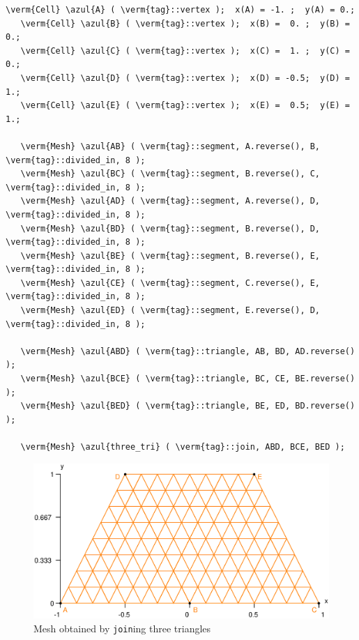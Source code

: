 \begin{Verbatim}[commandchars=\\\{\},formatcom=\small\tt,frame=single,
   label=parag-\ref{\numb section 1.\numb parag 4}.cpp,rulecolor=\color{coment},
   baselinestretch=0.94,framesep=2mm]
   \verm{Cell} \azul{A} ( \verm{tag}::vertex );  x(A) = -1. ;  y(A) = 0.;
   \verm{Cell} \azul{B} ( \verm{tag}::vertex );  x(B) =  0. ;  y(B) = 0.;
   \verm{Cell} \azul{C} ( \verm{tag}::vertex );  x(C) =  1. ;  y(C) = 0.;
   \verm{Cell} \azul{D} ( \verm{tag}::vertex );  x(D) = -0.5;  y(D) = 1.;
   \verm{Cell} \azul{E} ( \verm{tag}::vertex );  x(E) =  0.5;  y(E) = 1.;

   \verm{Mesh} \azul{AB} ( \verm{tag}::segment, A.reverse(), B, \verm{tag}::divided_in, 8 );
   \verm{Mesh} \azul{BC} ( \verm{tag}::segment, B.reverse(), C, \verm{tag}::divided_in, 8 );
   \verm{Mesh} \azul{AD} ( \verm{tag}::segment, A.reverse(), D, \verm{tag}::divided_in, 8 );
   \verm{Mesh} \azul{BD} ( \verm{tag}::segment, B.reverse(), D, \verm{tag}::divided_in, 8 );
   \verm{Mesh} \azul{BE} ( \verm{tag}::segment, B.reverse(), E, \verm{tag}::divided_in, 8 );
   \verm{Mesh} \azul{CE} ( \verm{tag}::segment, C.reverse(), E, \verm{tag}::divided_in, 8 );
   \verm{Mesh} \azul{ED} ( \verm{tag}::segment, E.reverse(), D, \verm{tag}::divided_in, 8 );

   \verm{Mesh} \azul{ABD} ( \verm{tag}::triangle, AB, BD, AD.reverse() );
   \verm{Mesh} \azul{BCE} ( \verm{tag}::triangle, BC, CE, BE.reverse() );
   \verm{Mesh} \azul{BED} ( \verm{tag}::triangle, BE, ED, BD.reverse() );

   \verm{Mesh} \azul{three_tri} ( \verm{tag}::join, ABD, BCE, BED );
\end{Verbatim}

\begin{figure}[ht] \centering
  \includegraphics[width=130mm]{three-tri}
  \caption{Mesh obtained by {\small\tt join}ing three triangles}
  \label{\numb section 1.\numb fig 7}
\end{figure}



